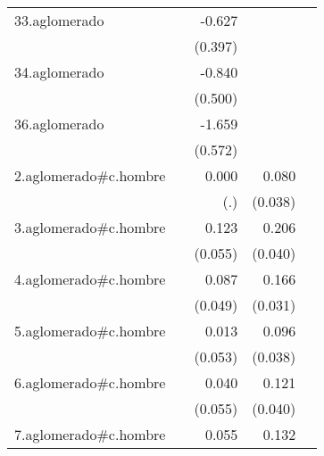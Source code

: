 {\begin{longtable}{l*{4}{D{.}{.}{-1}}}
\addlinespace
33.aglomerado&                     &      -0.627         &                     &                     \\
            &                     &     (0.397)         &                     &                     \\
\addlinespace
34.aglomerado&                     &      -0.840         &                     &                     \\
            &                     &     (0.500)         &                     &                     \\
\addlinespace
36.aglomerado&                     &      -1.659\sym{**} &                     &                     \\
            &                     &     (0.572)         &                     &                     \\
\addlinespace
2.aglomerado#c.hombre&                     &       0.000         &       0.080\sym{*}  &                     \\
            &                     &         (.)         &     (0.038)         &                     \\
\addlinespace
3.aglomerado#c.hombre&                     &       0.123\sym{*}  &       0.206\sym{***}&                     \\
            &                     &     (0.055)         &     (0.040)         &                     \\
\addlinespace
4.aglomerado#c.hombre&                     &       0.087         &       0.166\sym{***}&                     \\
            &                     &     (0.049)         &     (0.031)         &                     \\
\addlinespace
5.aglomerado#c.hombre&                     &       0.013         &       0.096\sym{*}  &                     \\
            &                     &     (0.053)         &     (0.038)         &                     \\
\addlinespace
6.aglomerado#c.hombre&                     &       0.040         &       0.121\sym{**} &                     \\
            &                     &     (0.055)         &     (0.040)         &                     \\
\addlinespace
7.aglomerado#c.hombre&                     &       0.055         &       0.132\sym{***}&                     \\

\end{longtable}}
